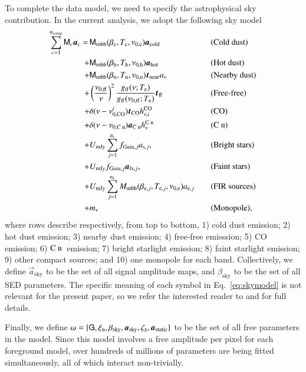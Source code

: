 \documentclass{aa}
\newcommand{\cii}{\ensuremath{\mathsc {C\ ii}}}
\renewcommand{\t}[0]{\vec{t}}
\newcommand{\G}[0]{\tens{G}}
\renewcommand{\a}[0]{\vec{a}}
\newcommand{\M}[0]{\tens{M}}
\newcommand{\Te}[0]{T_{\rm e}}
\newcommand{\mathsc}[1]{{\normalfont\textsc{#1}}}
\def\Tcold{\ifmmode T_\mathrm{c}\else $T_{\mathrm{c}}$\fi}
\def\Thot{\ifmmode T_\mathrm{h}\else $T_{\mathrm{h}}$\fi}
\def\Tnear{\ifmmode T_\mathrm{n}\else $T_{\mathrm{n}}$\fi}
\def\bcold{\ifmmode \beta_\mathrm{c}\else $\beta_{\mathrm{c}}$\fi}
\def\bhot{\ifmmode \beta_\mathrm{h}\else $\beta_{\mathrm{h}}$\fi}
\def\bnear{\ifmmode \beta_\mathrm{n}\else $\beta_{\mathrm{n}}$\fi}
\def\nuzeroff{\ifmmode \nu_{0,\mathrm{ff}}\else $\nu_{0,\mathrm{ff}}$\fi}
\def\nuzerocold{\ifmmode \nu_{0,\mathrm{c}}\else $\nu_{0,\mathrm{c}}$\fi}
\def\nuzerohot{\ifmmode \nu_{0,\mathrm{h}}\else $\nu_{0,\mathrm{h}}$\fi}
\def\nuzeronear{\ifmmode \nu_{0,\mathrm{n}}\else $\nu_{0,\mathrm{n}}$\fi}
\def\Te{\ifmmode T_{\mathrm{e}}\else $T_{\mathrm{e}}$\fi}
\begin{document}
To complete the data model, we need to specify the astrophysical sky
contribution. In the current analysis, we adopt the following sky model
\begin{alignat}{4}
  \sum_{c=1}^{n_{\mathrm{comp}}} \M_c \a_c  = \,
  &\M_{\mathrm{mbb}}(\bcold,\Tcold,\nuzerocold)\vec{a}_{\mathrm{cold}}
  && \textrm{(Cold dust)}\label{eq:skymodel}\\
  + &\M_{\mathrm{mbb}}(\bhot,\Thot,\nuzerohot)
  \vec{a}_{\mathrm{hot}} && \textrm{(Hot dust)}\nonumber \\
  + &\M_{\mathrm{mbb}}(\bnear,\Tnear,\nuzeronear) \t_{\mathrm{near}}
  a_{\nu} && \textrm{(Nearby dust)} \nonumber \\
  + &\left(\frac{\nuzeroff}{\nu}\right)^2
  \frac{g_{\mathrm{ff}}(\nu;\Te) }{g_{\mathrm{ff}}(\nuzeroff;\Te)}
  \vec{t}_{\mathrm{ff}} && \textrm{(Free-free)} \nonumber\\
  + &\delta(\nu-\nu_{0,\mathrm{CO}}^i) \t_{\mathrm{CO}}
  h^{\mathrm{CO}}_{\nu,i} && \textrm{(CO)}\nonumber\\
  + &\delta(\nu-\nu_{0,\cii}) \a_{\cii}
	h^{\cii}_{\nu} && (\cii)\nonumber \\
  + &U_{\mathrm{mJy}} \sum_{j=1}^{n_{\mathrm{s}}}
  f_{\mathit{Gaia},j} a_{\mathrm{s},j}, &\quad&
  \textrm{(Bright stars)} \nonumber\\
  + &U_{\mathrm{mJy}} f_{\mathit{Gaia},j} \a_{\mathrm{fs},j}, &\quad&
  \textrm{(Faint stars)} \nonumber\\  
    + &U_{\mathrm{mJy}} \sum_{j=1}^{n_{\mathrm{e}}}
  M_{\mathrm{mbb}}(\beta_{\mathrm{e},j},
  T_{\mathrm{e},j}, \nu_{0,\mathrm{e}})
  a_{\mathrm{e},j} && \textrm{(FIR sources)}\nonumber\\
  + &m_{\nu} && \textrm{(Monopole)}, \nonumber
\end{alignat}
where rows describe respectively, from top to bottom, 1) cold dust
emission; 2) hot dust emission; 3) nearby dust emission; 4) free-free
emisssion; 5) CO emission; 6) \cii\ emission; 7) bright starlight
emission; 8) faint starlight emission; 9) other compact sources; and
10) one monopole for each band. Collectively, we define
$\a_{\mathrm{sky}}$ to be the set of all signal amplitude maps, and
$\beta_{\mathrm{sky}}$ to be the set of all SED parameters. The
specific meaning of each symbol in Eq.~\eqref{eq:skymodel} is not
relevant for the present paper, so we
refer the interested reader to \citet{CG02_04} and \citet{CG02_05} for
full details.


Finally, we define $\omega = \{\G,\xi_{\mathrm{n}},
\beta_{\mathrm{sky}},\a_{\mathrm{sky}},\zeta_{\mathrm{z}},\a_{\mathrm{static}}\}$
to be the set of all free parameters in the model. Since this model involves
a free amplitude per pixel for each foreground model, over
hundreds of millions of parameters are being fitted simultaneously,
all of which interact non-trivially.
\end{document}
